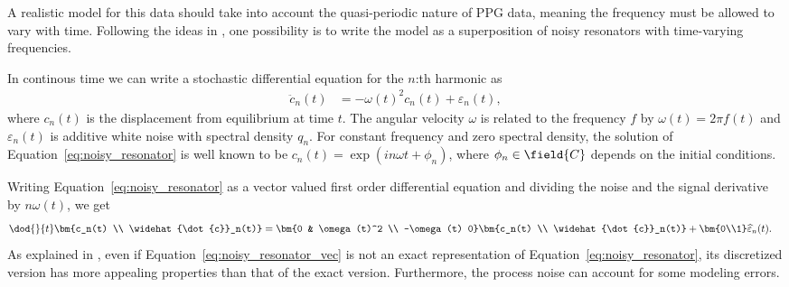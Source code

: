 A realistic model for this data 
should take into account the quasi-periodic nature of PPG data,
meaning the frequency must be allowed to vary with time.
Following the ideas in \textcite{Sarkka2012}, one possibility
is to write the model as a superposition of noisy resonators
with time-varying frequencies.

In continous time we can write a stochastic differential equation
for the $n$:th harmonic as
\begin{align}
	 \ddot{c}_n(t)&= -\omega(t)^2c_n(t)+\varepsilon_n(t),
	\label{eq:noisy_resonator}
\end{align}
where $c_n(t)$ is the displacement from equilibrium at time $t$.
The angular velocity $\omega$ is related to the frequency $f$
by $\omega(t)=2\pi f(t)$ and  $\varepsilon_n(t)$ is additive
white noise with spectral density $q_n$. For constant frequency and
zero spectral density, the solution of Equation~\eqref{eq:noisy_resonator}
is well known to be $c_n(t)=\exp(i n \omega t+\phi_n)$, where $\phi_n\in\field{C}$ depends on 
the initial conditions.

Writing Equation~\eqref{eq:noisy_resonator} as a vector valued first order differential equation
and dividing the noise and the signal derivative by $n\omega(t)$, we get
\begin{align}
	\dod{}{t}\bm{c_n(t) \\ \widehat{\dot{c}}_n(t)} &= \bm{0 & \omega(t)^2 \\ -\omega(t) 0}\bm{c_n(t) \\
	\widehat{\dot{c}}_n(t)}+\bm{0\\1}
	\widehat{\varepsilon}_n(t).
	\label{eq:noisy_resonator_vec}
\end{align}
As explained in \textcite{Sarkka2012}, even if Equation~\eqref{eq:noisy_resonator_vec} is not an exact
representation of Equation~\eqref{eq:noisy_resonator}, its discretized version has more appealing
properties than that of the exact version. Furthermore, the process noise can account for some
modeling errors. 

